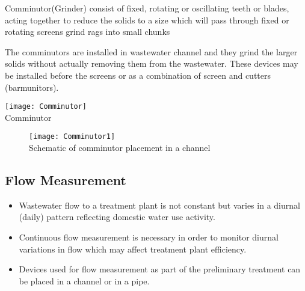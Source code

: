 					\begin{itemize}
\begin{minipage}{\textwidth}	\item Comminutor(Grinder) consist of fixed, rotating or oscillating teeth or blades, acting together to reduce the solids to a size which will pass through fixed or rotating screens grind rags into small chunks
\item The comminutors are installed in wastewater channel and they grind the larger solids without actually removing them from the wastewater.  These devices may be installed before the screens or as a combination of screen and cutters (barmunitors).
					\end{minipage}	
					\end{itemize}
					\begin{minipage}{\textwidth}
					\begin{center}
      \texttt{[image: Comminutor]}\\
      Comminutor\\
\end{center}
    \end{minipage}

\begin{figure}[h]
    \texttt{[image: Comminutor1]}\\
    \hspace{5cm}Schematic of comminutor placement in a channel\\
  \end{figure}
  
		\subsection{Flow Measurement}
					\begin{itemize}
						\item Wastewater flow to a treatment plant is not constant but varies in a diurnal (daily) pattern reflecting domestic water use activity.
						\item Continuous flow measurement is necessary in order to monitor diurnal variations in flow which may affect treatment plant efficiency.\\
						\item Devices used for flow measurement as part of the preliminary treatment can be placed in a channel or in a pipe.
					\end{itemize}

